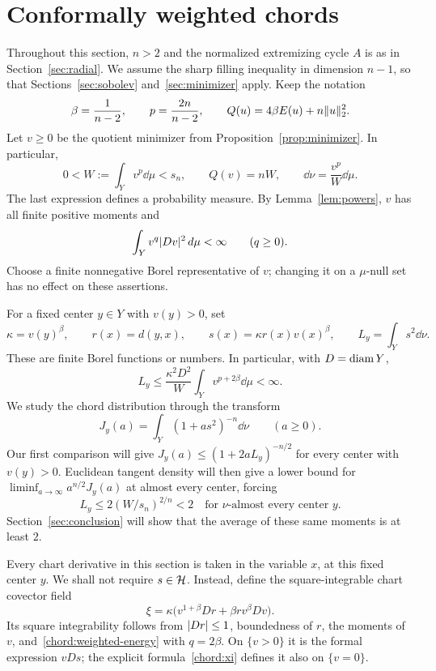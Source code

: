 \section{Conformally weighted chords}\label{sec:chords}

Throughout this section, $n>2$ and the normalized extremizing cycle
$A$ is as in Section~\ref{sec:radial}. We assume the sharp filling
inequality in dimension $n-1$, so that Sections~\ref{sec:sobolev}
and~\ref{sec:minimizer} apply. Keep the notation
\[
 \beta=\frac1{n-2},\qquad p=\frac{2n}{n-2},\qquad
 Q(u)=4\beta E(u)+n\lVert u\rVert_2^2.
\]
Let $v\ge0$ be the quotient minimizer from
Proposition~\ref{prop:minimizer}. In particular,
\begin{equation}\label{chord:normalization}
 0<W:=\int_Y v^p\dd\mu<s_n,\qquad Q(v)=nW,
 \qquad \dd\nu=\frac{v^p}{W}\dd\mu.
\end{equation}
The last expression defines a probability measure. By
Lemma~\ref{lem:powers}, $v$ has all finite positive moments and
\begin{equation}\label{chord:weighted-energy}
 \int_Y v^q\lvert Dv\rvert^2\,d\mu<\infty\qquad(q\ge0).
\end{equation}
Choose a finite nonnegative Borel representative of $v$; changing
it on a $\mu$-null set has no effect on these assertions.

For a fixed center $y\in Y$ with $v(y)>0$, set
\begin{equation}\label{chord:data}
 \kappa=v(y)^\beta,\qquad r(x)=d(y,x),\qquad
 s(x)=\kappa r(x)v(x)^\beta,
 \qquad L_y=\int_Y s^2\dd\nu.
\end{equation}
These are finite Borel functions or numbers. In particular, with
$D=\operatorname{diam} Y$,
\[
 L_y\le\frac{\kappa^2D^2}{W}
             \int_Y v^{p+2\beta}\dd\mu<\infty.
\]
We study the chord distribution through the transform
\begin{equation}\label{chord:transform-definition}
 J_y(a)=\int_Y(1+as^2)^{-n}\dd\nu\qquad(a\ge0).
\end{equation}
Our first comparison will give
$J_y(a)\le(1+2aL_y)^{-n/2}$ for every center with $v(y)>0$.
Euclidean tangent density will then give a lower bound for
$\liminf_{a\to\infty}a^{n/2}J_y(a)$ at almost every center, forcing
\[
 L_y\le2(W/s_n)^{2/n}<2
 \quad\text{for $\nu$-almost every center $y$}.
\]
Section~\ref{sec:conclusion} will show that the average of these same
moments is at least $2$.

Every chart derivative in this section is taken in the variable
$x$, at this fixed center $y$. We shall not require $s\in\mathcal H$.
Instead, define the square-integrable chart covector field
\begin{equation}\label{chord:xi}
 \xi=\kappa\bigl(v^{1+\beta}Dr
                   +\beta r v^\beta Dv\bigr).
\end{equation}
Its square integrability follows from $\lvert Dr\rvert\le1$, boundedness
of $r$, the moments of $v$, and~\eqref{chord:weighted-energy} with
$q=2\beta$. On $\{v>0\}$ it is the formal expression $vDs$;
the explicit formula~\eqref{chord:xi} defines it also on $\{v=0\}$.

